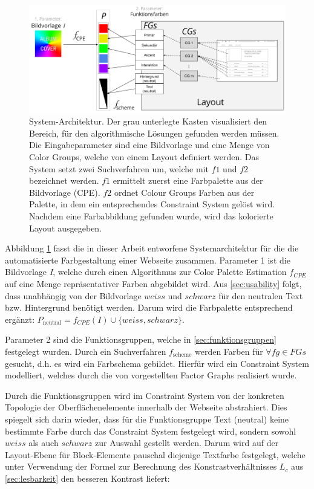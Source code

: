 \begin{figure}
	\centering
	\includegraphics[width=1\textwidth]{img/architecture.png}
	\caption{System-Architektur. Der grau unterlegte Kasten visualisiert den Bereich, für den algorithmische Lösungen gefunden werden müssen. Die Eingabeparameter sind eine Bildvorlage und eine Menge von Color Groups, welche von einem Layout definiert werden. Das System setzt zwei Suchverfahren um, welche mit $f1$ und $f2$ bezeichnet werden. $f1$ ermittelt zuerst eine Farbpalette aus der Bildvorlage (CPE). $f2$ ordnet Colour Groups Farben aus der Palette, in dem ein entsprechendes Constraint System gelöst wird. Nachdem eine Farbabbildung gefunden wurde, wird das kolorierte Layout ausgegeben.}
	\label{fig:architecture}
\end{figure}

Abbildung \ref{fig:architecture} fasst die in dieser Arbeit entworfene Systemarchitektur für die die automatisierte Farbgestaltung einer Webseite zusammen. Parameter 1 ist die Bildvorlage \emph{I}, welche durch einen Algorithmus zur Color Palette Estimation $f_{CPE}$ auf eine Menge repräsentativer Farben abgebildet wird. Aus \autoref{sec:usability} folgt, dass unabhängig von der Bildvorlage $weiss$ und $schwarz$ für den neutralen Text bzw. Hintergrund benötigt werden. Darum wird die Farbpalette entsprechend ergänzt: $P_\text{neutral} = f_{CPE}(I) \cup \{weiss, schwarz\}$.

Parameter 2 sind die Funktionsgruppen, welche in \autoref{sec:funktionsgruppen} festgelegt wurden. Durch ein Suchverfahren $f_\text{scheme}$ werden Farben für $\forall fg \in FGs$ gesucht, d.h. es wird ein Farbschema gebildet. Hierfür wird ein Constraint System modelliert, welches durch die von \citet{patterns} vorgestellten Factor Graphs realisiert wurde.

Durch die Funktionsgruppen wird im Constraint System von der konkreten Topologie der Oberflächenelemente innerhalb der Webseite abstrahiert. Dies spiegelt sich darin wieder, dass für die Funktionsgruppe \glqq{}Text (neutral)\grqq{} keine bestimmte Farbe durch das Constraint System festgelegt wird, sondern sowohl $weiss$ als auch $schwarz$ zur Auswahl gestellt werden. Darum wird auf der Layout-Ebene für Block-Elemente pauschal diejenige Textfarbe festgelegt, welche unter Verwendung der Formel zur Berechnung des Konstrastverhältnisses $L_c$ aus \autoref{sec:lesbarkeit} den besseren Kontrast liefert:


